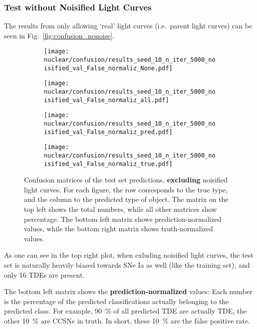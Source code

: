 \subsubsection{Test without Noisified Light Curves}
The results from only allowing `real' light curves (i.e.~parent light curves) can be seen in Fig.~\ref{fig:confusion_nonoise}.

\begin{figure}[htb]
  \centering
  \begin{subfigure}[b]{0.49\textwidth}
    \centering
    \texttt{[image: nuclear/confusion/results\_seed\_10\_n\_iter\_5000\_noisified\_val\_False\_normaliz\_None.pdf]}
  \end{subfigure}
  \begin{subfigure}[b]{0.49\textwidth}
    \centering
    \texttt{[image: nuclear/confusion/results\_seed\_10\_n\_iter\_5000\_noisified\_val\_False\_normaliz\_all.pdf]}
  \end{subfigure}
  \begin{subfigure}[b]{0.49\textwidth}
    \centering
    \texttt{[image: nuclear/confusion/results\_seed\_10\_n\_iter\_5000\_noisified\_val\_False\_normaliz\_pred.pdf]}
  \end{subfigure}
  \begin{subfigure}[b]{0.49\textwidth}
    \centering
    \texttt{[image: nuclear/confusion/results\_seed\_10\_n\_iter\_5000\_noisified\_val\_False\_normaliz\_true.pdf]}
  \end{subfigure}
  \caption[Confusion matrices without augmentation]{Confusion matrices of the test set predictions, \textbf{excluding} noisified light curves. For each figure, the row corresponds to the true type, and the column to the predicted type of object. The matrix on the top left shows the total numbers, while all other matrices show percentage. The bottom left matrix shows prediction-normalized values, while the bottom right matrix shows truth-normalized values.}
\end{figure}

As one can see in the top right plot, when exluding noisified light curves, the test set is naturally heavily biased towards SNe Ia as well (like the training set), and only 16 TDEs are present.

The bottom left matrix shows the \textbf{prediction-normalized} values: Each number is the percentage of the predicted classifications actually belonging to the predicted class. For example, \SI{90}{\percent} of all predicted TDE are actually TDE, the other \SI{10}{\percent} are CCSNe in truth. In short, these \SI{10}{\percent} are the false positive rate.

